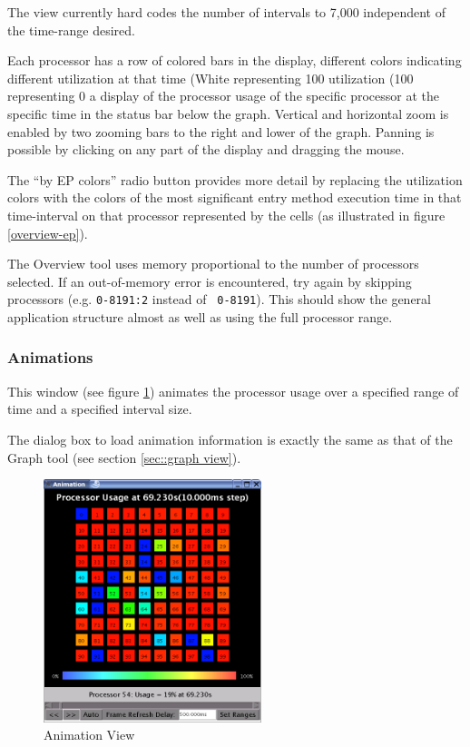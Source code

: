 \documentclass[10pt]{article}
\begin{document}
The view currently hard codes the number of intervals to 7,000
independent of the time-range desired.

Each processor has a row of colored bars in the display, different
colors indicating different utilization at that time (White
representing 100%
utilization (100%
representing 0%
a display of the processor usage of the specific processor at the
specific time in the status bar below the graph. Vertical and
horizontal zoom is enabled by two zooming bars to the right and lower
of the graph. Panning is possible by clicking on any part of the
display and dragging the mouse.

The ``by EP colors'' radio button provides more detail by replacing
the utilization colors with the colors of the most significant entry
method execution time in that time-interval on that processor
represented by the cells (as illustrated in figure
\ref{overview-ep}). 

The Overview tool uses memory proportional to the number of processors
selected. If an out-of-memory error is encountered, try again by
skipping processors (e.g. {\tt 0-8191:2} instead of {\tt
0-8191}). This should show the general application structure almost as
well as using the full processor range.

\subsubsection{Animations}

This window (see figure \ref{animation}) animates the processor usage
over a specified range of time and a specified interval size.

The dialog box to load animation information is exactly the same as
that of the Graph tool (see section \ref{sec::graph view}).

\begin{figure}[htb]
\center
\includegraphics[width=2.5in]{fig/animation}
\caption{Animation View}
\label{animation}
\end{figure}
\end{document}
